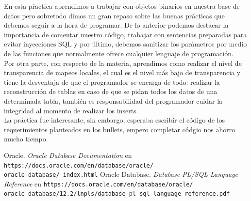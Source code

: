 \documentclass{article}
\begin{document}
En esta pŕactica aprendimos a trabajar con objetos binarios en nuestra base
de datos pero sobretodo dimos un gran repaso sobre las buenas prácticas
que debemos seguir a la hora de programar. De lo anterior podemos destacar la
importancia de comentar nuestro código, trabajar con sentencias preparadas
para evitar inyecciones SQL y por último, debemos sanitizar los parámetros
por medio de las funciones que normalmente ofrece cualquier lenguaje de
programación.\\

Por otra parte, con respecto de la materia, aprendimos como realizar el
nivel de transparencia de mapeos locales, el cual es el nivel más bajo de 
transparencia y tiene la desventaja de que el programador se encarga de todo:
realizar la reconstrucción de tablas en caso de que se pidan todos los 
datos de una determinada tabla, también es responsabilidad del programador 
cuidar la integridad al momento de realizar los inserts.\\

La práctica fue interesante, sin embargo, esperaba escribir el código de los
requerimientos planteados en los bullets, empero completar códgio nos ahorro
mucho tiempo.

\renewcommand\refname{Bibliografía}
\begin{thebibliography}{99}
     Oracle. \textit{Oracle Database Documentation} en 
        \texttt{https://docs.oracle.com/en/database/oracle/\\oracle-database/%
        index.html}
     Oracle Database. \textit{Database PL/SQL Language 
        Reference} en 
        \texttt{https://docs.oracle.com/en/database/oracle/\\
        oracle-database/12.2/lnpls/database-pl-sql-language-reference.pdf}
\end{thebibliography}
\end{document}
